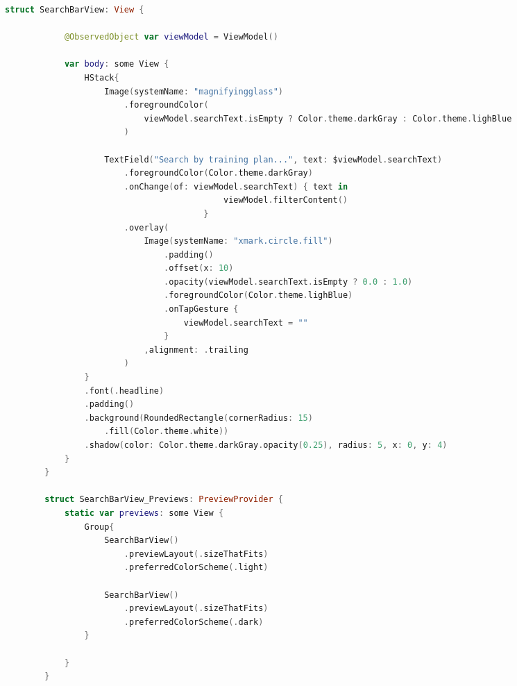 \begin{spacing}{2}
\end{spacing}
\begin{minipage}{\textwidth}
    \linespread{0.8}\selectfont
    \begin{lstlisting}[language=swift]
        struct SearchBarView: View {
            
            @ObservedObject var viewModel = ViewModel()
            
            var body: some View {
                HStack{
                    Image(systemName: "magnifyingglass")
                        .foregroundColor(
                            viewModel.searchText.isEmpty ? Color.theme.darkGray : Color.theme.lighBlue
                        )
                    
                    TextField("Search by training plan...", text: $viewModel.searchText)
                        .foregroundColor(Color.theme.darkGray)
                        .onChange(of: viewModel.searchText) { text in
                                            viewModel.filterContent()
                                        }
                        .overlay(
                            Image(systemName: "xmark.circle.fill")
                                .padding()
                                .offset(x: 10)
                                .opacity(viewModel.searchText.isEmpty ? 0.0 : 1.0)
                                .foregroundColor(Color.theme.lighBlue)
                                .onTapGesture {
                                    viewModel.searchText = ""
                                }
                            ,alignment: .trailing
                        )
                }
                .font(.headline)
                .padding()
                .background(RoundedRectangle(cornerRadius: 15)
                    .fill(Color.theme.white))
                .shadow(color: Color.theme.darkGray.opacity(0.25), radius: 5, x: 0, y: 4)
            }
        }

        struct SearchBarView_Previews: PreviewProvider {
            static var previews: some View {
                Group{
                    SearchBarView()
                        .previewLayout(.sizeThatFits)
                        .preferredColorScheme(.light)
                    
                    SearchBarView()
                        .previewLayout(.sizeThatFits)
                        .preferredColorScheme(.dark)
                }
                
            }
        }
    \end{lstlisting}   
\end{minipage}

